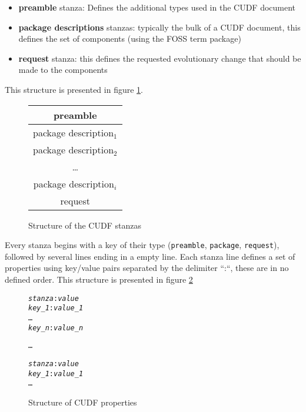 \begin{itemize}
  \item \textbf{preamble} stanza: Defines the additional types used in the CUDF document
  \item \textbf{package descriptions} stanzas: typically the bulk of a CUDF document, this defines the set of components (using the FOSS term package)
  \item \textbf{request} stanza: this defines the requested evolutionary change that should be made to the components 
\end{itemize}

This structure is presented in figure \ref{formal:cudfstruct}.

\begin{figure}[htp]
\centering
\begin{tabular}{|c|}
\hline preamble \\ \hline
\hline package description$_{1}$ \\ \hline
\hline package description$_{2}$ \\ \hline
 \multicolumn{1}{c}{\ldots}  \\ 
\hline package description$_{i}$\\ \hline
\hline request\\ \hline
\end{tabular}
\caption{Structure of the CUDF stanzas}
\label{formal:cudfstruct}
\end{figure}

Every stanza begins with a key of their type (\verb+preamble+, \verb+package+, \verb+request+), followed by several lines ending in a empty line.
Each stanza line defines a set of properties using key/value pairs separated by the delimiter ``:``, these are in no defined order.
This structure is presented in figure \ref{formal.cudfproperties}

\begin{figure}[htp] 
\begin{center}
\begin{alltt}
\textit{stanza}: \textit{value}
\textit{key_1}: \textit{value_1}
\ldots
\textit{key_n}: \textit{value_n}

\ldots

\textit{stanza}: \textit{value}
\textit{key_1}: \textit{value_1}
\ldots
\end{alltt}
  \caption[CUDF property structure]{Structure of CUDF properties}
  \label{formal.cudfproperties}
\end{center}
\end{figure}

